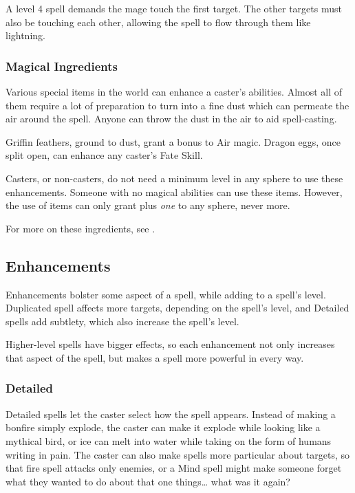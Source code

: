 \begin{multicols}{2}
A level 4 spell demands the mage touch the first target.
The other targets must also be touching each other, allowing the spell to flow through them like lightning.

\subsubsection{Magical Ingredients}

Various special items in the world can enhance a caster's abilities.
Almost all of them require a lot of preparation to turn into a fine dust which can permeate the air around the spell.
Anyone can throw the dust in the air to aid spell-casting.

Griffin feathers, ground to dust, grant a bonus to Air magic.
Dragon eggs, once split open, can enhance any caster's Fate Skill.

Casters, or non-casters, do not need a minimum level in any sphere to use these enhancements.
Someone with no magical abilities can use these items.
However, the use of items can only grant plus \emph{one} to any sphere, never more.

For more on these ingredients, see .

\subsection{Enhancements}

Enhancements bolster some aspect of a spell, while adding to a spell's level.
Duplicated spell affects more targets, depending on the spell's level, and Detailed spells add subtlety, which also increase the spell's level.

Higher-level spells have bigger effects, so each enhancement not only increases that aspect of the spell, but makes a spell more powerful in every way.

\subsubsection{Detailed}

Detailed spells let the caster select how the spell appears.
Instead of making a bonfire simply explode, the caster can make it explode while looking like a mythical bird, or ice can melt into water while taking on the form of humans writing in pain.
The caster can also make spells more particular about targets, so that fire spell attacks only enemies, or a Mind spell might make someone forget what they wanted to do about that one things\ldots{} what was it again?


\end{multicols}
